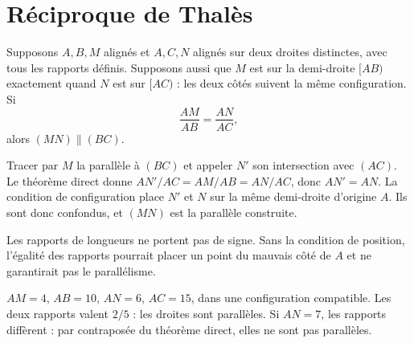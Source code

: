 \documentclass[../cours_3e.tex]{subfiles}
\begin{document}
\section{Réciproque de Thalès}
\begin{theoreme}
Supposons $A,B,M$ alignés et $A,C,N$ alignés sur deux droites distinctes, avec tous les rapports définis. Supposons aussi que $M$ est sur la demi-droite $[AB)$ exactement quand $N$ est sur $[AC)$ : les deux côtés suivent la même configuration. Si
\[\frac{AM}{AB}=\frac{AN}{AC},\]
alors $(MN)\parallel(BC)$.
\end{theoreme}
\begin{demonstration}
Tracer par $M$ la parallèle à $(BC)$ et appeler $N'$ son intersection avec $(AC)$. Le théorème direct donne $AN'/AC=AM/AB=AN/AC$, donc $AN'=AN$. La condition de configuration place $N'$ et $N$ sur la même demi-droite d'origine $A$. Ils sont donc confondus, et $(MN)$ est la parallèle construite.
\end{demonstration}
\begin{attention}
Les rapports de longueurs ne portent pas de signe. Sans la condition de position, l'égalité des rapports pourrait placer un point du mauvais côté de $A$ et ne garantirait pas le parallélisme.
\end{attention}
\begin{exemple}
$AM=4$, $AB=10$, $AN=6$, $AC=15$, dans une configuration compatible. Les deux rapports valent $2/5$ : les droites sont parallèles. Si $AN=7$, les rapports diffèrent : par contraposée du théorème direct, elles ne sont pas parallèles.
\end{exemple}
\end{document}
